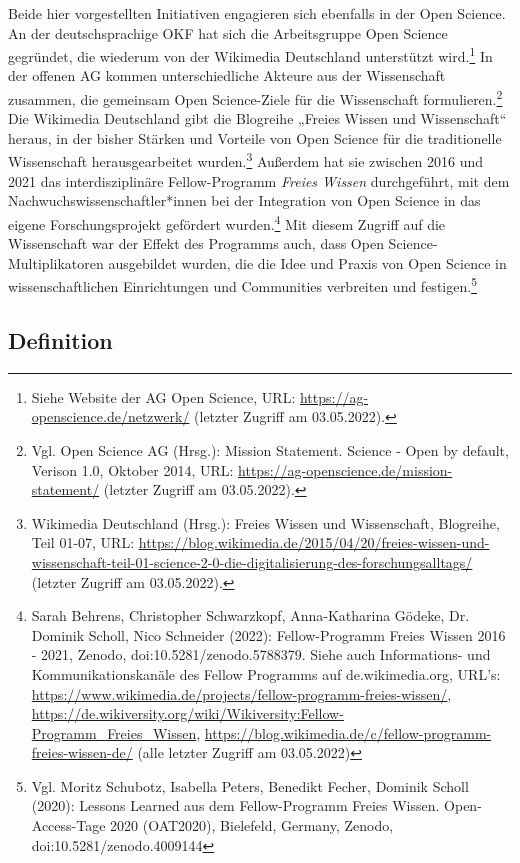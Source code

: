 Beide hier vorgestellten Initiativen engagieren sich ebenfalls in der Open Science. An der deutschsprachige OKF hat sich die Arbeitsgruppe Open Science gegründet, die wiederum von der Wikimedia Deutschland unterstützt wird.\footnote{Siehe Website der AG Open Science, URL: \url{https://ag-openscience.de/netzwerk/} (letzter Zugriff am 03.05.2022).} In der offenen AG kommen unterschiedliche Akteure aus der Wissenschaft zusammen, die gemeinsam Open Science-Ziele für die Wissenschaft formulieren.\footnote{Vgl. Open Science AG (Hrsg.): Mission Statement. Science - Open by default, Verison 1.0, Oktober 2014, URL: \url{https://ag-openscience.de/mission-statement/} (letzter Zugriff am 03.05.2022).} Die Wikimedia Deutschland gibt die Blogreihe „Freies Wissen und Wissenschaft“ heraus, in der bisher Stärken und Vorteile von Open Science für die traditionelle Wissenschaft herausgearbeitet wurden.\footnote{Wikimedia Deutschland (Hrsg.): Freies Wissen und Wissenschaft, Blogreihe, Teil 01-07, URL: \url{https://blog.wikimedia.de/2015/04/20/freies-wissen-und-wissenschaft-teil-01-science-2-0-die-digitalisierung-des-forschungsalltags/} (letzter Zugriff am 03.05.2022).} Außerdem hat sie zwischen 2016 und 2021 das interdisziplinäre Fellow-Programm \textit{Freies Wissen} durchgeführt, mit dem Nachwuchswissenschaftler*innen bei der Integration von Open Science in das eigene Forschungsprojekt gefördert wurden.\footnote{Sarah Behrens, Christopher Schwarzkopf, Anna-Katharina Gödeke, Dr. Dominik Scholl, Nico Schneider (2022): Fellow-Programm Freies Wissen 2016 - 2021, Zenodo, doi:10.5281/zenodo.5788379. Siehe auch Informations- und Kommunikationskanäle des Fellow Programms auf de.wikimedia.org, URL's: \url{https://www.wikimedia.de/projects/fellow-programm-freies-wissen/}, \url{https://de.wikiversity.org/wiki/Wikiversity:Fellow-Programm_Freies_Wissen}, \url{https://blog.wikimedia.de/c/fellow-programm-freies-wissen-de/} (alle letzter Zugriff am 03.05.2022)} Mit diesem Zugriff auf die Wissenschaft war der Effekt des Programms auch, dass Open Science-Multiplikatoren ausgebildet wurden, die die Idee und Praxis von Open Science in wissenschaftlichen Einrichtungen und Communities verbreiten und festigen.\footnote{Vgl. Moritz Schubotz, Isabella Peters, Benedikt Fecher, Dominik Scholl (2020): Lessons Learned aus dem Fellow-Programm Freies Wissen. Open-Access-Tage 2020 (OAT2020), Bielefeld, Germany, Zenodo, doi:10.5281/zenodo.4009144}

\subsection{Definition} 

